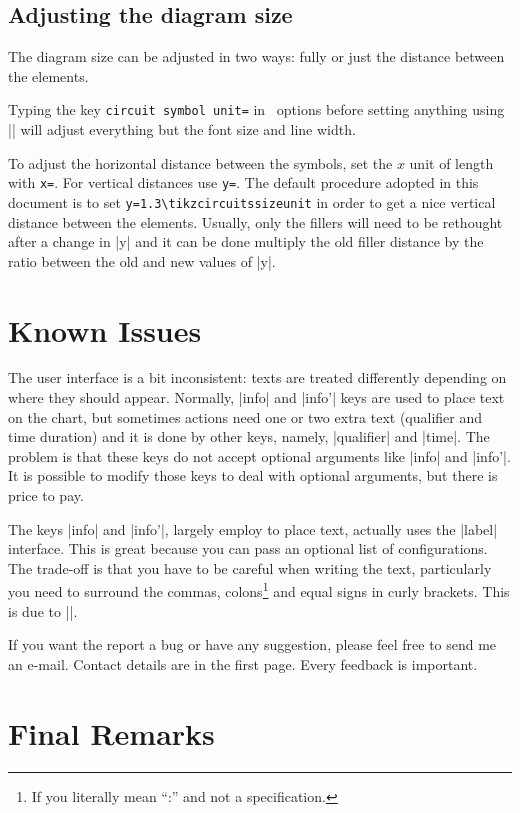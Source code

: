 \documentclass[a4paper]{ltxdoc}
\begin{document}
\subsection{Adjusting the diagram size}
The diagram size can be adjusted in two ways: fully or just the distance between the elements.

Typing the key \verb|circuit symbol unit=| in \tikzname\ options before setting anything using |\tikzcircuitssizeunit| will adjust everything but the font size and line width. 

To adjust the horizontal distance between the symbols, set the $x$ unit of length with \verb|x=|. For vertical distances use \verb|y=|. The default procedure adopted in this document is to set \verb|y=1.3\tikzcircuitssizeunit| in order to get a nice vertical distance between the elements. Usually, only the fillers will need to be rethought after a change in |y| and it can be done multiply the old filler distance by the ratio between the old and new values of |y|. 


\section{Known Issues}
The user interface is a bit inconsistent: texts are treated differently depending on where they should appear. Normally, |info| and |info'| keys are used to place text on the chart, but sometimes actions need one or two extra text (qualifier and time duration) and it is done by other keys, namely, |qualifier| and |time|. The problem is that these keys do not accept optional arguments like |info| and |info'|. It is possible to modify those keys to deal with optional arguments, but there is price to pay.

The keys |info| and |info'|, largely employ to place text, actually uses the |label| interface. This is great because you can pass an optional list of configurations. The trade-off is that you have to be careful when writing the text, particularly you need to surround the commas, colons\footnote{If you literally mean ``:'' and not a  specification.} and equal signs in curly brackets. This is due to |\pgfkeys|.

If you want the report a bug or have any suggestion, please feel free to send me an e-mail. Contact details are in the first page. Every feedback is important.


\section{Final Remarks}
\end{document}
